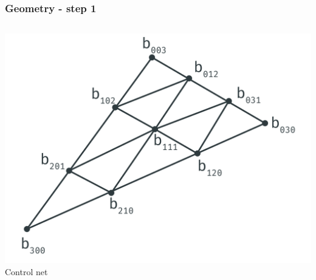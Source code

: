 	\begin{frame}\frametitle{Geometry - step 1}
		\begin{columns}
			\begin{column}{0.6\textwidth}
				\begin{center}
					\includegraphics[width=\textwidth]{img/1_single/geometry_1.png}
					\small{Control net}
				\end{center}
			\end{column}
		\end{columns}
	\end{frame}

